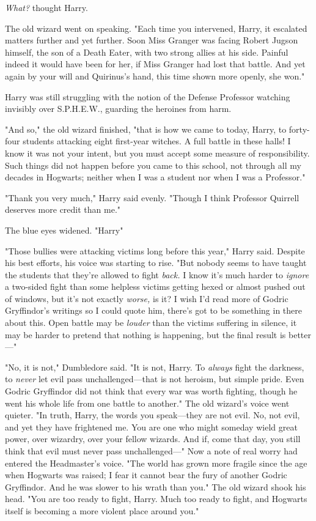 \emph{What?} thought Harry.

The old wizard went on speaking. "Each time you intervened, Harry, it escalated
matters further and yet further. Soon Miss Granger was facing Robert Jugson
himself, the son of a Death Eater, with two strong allies at his side. Painful
indeed it would have been for her, if Miss Granger had lost that battle. And
yet again by your will and Quirinus's hand, this time shown more openly, she
won."

Harry was still struggling with the notion of the Defense Professor watching
invisibly over S.P.H.E.W., guarding the heroines from harm.

"And so," the old wizard finished, "that is how we came to today, Harry, to
forty-four students attacking eight first-year witches. A full battle in these
halls! I know it was not your intent, but you must accept some measure of
responsibility. Such things did not happen before you came to this school, not
through all my decades in Hogwarts; neither when I was a student nor when I was
a Professor."

"Thank you very much," Harry said evenly. "Though I think Professor Quirrell
deserves more credit than me."

The blue eyes widened. "Harry{\el}"

"Those bullies were attacking victims long before this year," Harry said.
Despite his best efforts, his voice was starting to rise. "But nobody seems to
have taught the students that they're allowed to fight \emph{back.} I know it's
much harder to \emph{ignore} a two-sided fight than some helpless victims
getting hexed or almost pushed out of windows, but it's not exactly
\emph{worse,} is it? I wish I'd read more of Godric Gryffindor's writings so I
could quote him, there's got to be something in there about this. Open battle
may be \emph{louder} than the victims suffering in silence, it may be harder to
pretend that nothing is happening, but the final result is better\mbox{---}"

"No, it is not," Dumbledore said. "It is not, Harry. To \emph{always} fight the
darkness, to \emph{never} let evil pass unchallenged---that is not heroism, but
simple pride. Even Godric Gryffindor did not think that every war was worth
fighting, though he went his whole life from one battle to another." The old
wizard's voice went quieter. "In truth, Harry, the words you speak---they are
not evil. No, not evil, and yet they have frightened me. You are one who might
someday wield great power, over wizardry, over your fellow wizards. And if,
come that day, you still think that evil must never pass unchallenged\mbox{---}" Now a
note of real worry had entered the Headmaster's voice. "The world has grown
more fragile since the age when Hogwarts was raised; I fear it cannot bear the
fury of another Godric Gryffindor. And he was slower to his wrath than you."
The old wizard shook his head. "You are too ready to fight, Harry. Much too
ready to fight, and Hogwarts itself is becoming a more violent place around
you."

